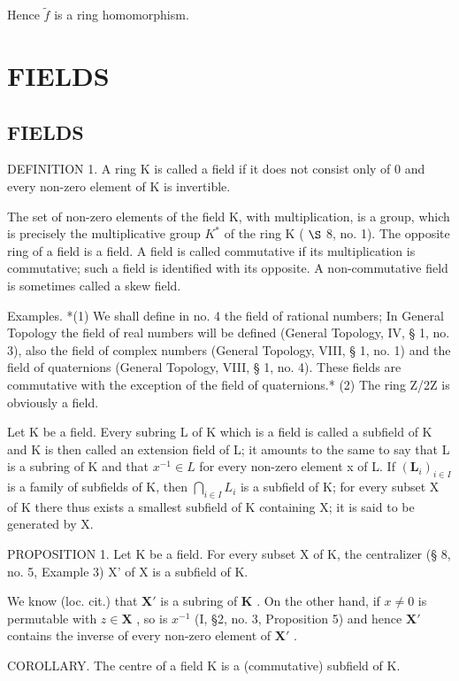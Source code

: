 Hence \(\tilde{f}\) is a ring homomorphism.

\section{FIELDS}

\subsection{FIELDS}

DEFINITION 1. A ring K is called a field if it does not consist only of 0 and every non-zero element of K is invertible.

The set of non-zero elements of the field K, with multiplication, is a group, which is precisely the multiplicative group \(K^{*}\) of the ring K ( \(\S\) 8, no. 1). The opposite ring of a field is a field. A field is called commutative if its multiplication is commutative; such a field is identified with its opposite. A non-commutative field is sometimes called a skew field.

Examples. *(1) We shall define in no. 4 the field of rational numbers; In General Topology the field of real numbers will be defined (General Topology, IV, § 1, no. 3), also the field of complex numbers (General Topology, VIII, § 1, no. 1) and the field of quaternions (General Topology, VIII, § 1, no. 4). These fields are commutative with the exception of the field of quaternions.* (2) The ring Z/2Z is obviously a field.

Let K be a field. Every subring L of K which is a field is called a subfield of K and K is then called an extension field of L; it amounts to the same to say that L is a subring of K and that \(x^{-1} \in L\) for every non-zero element x of L. If \((\mathbf{L}_{i})_{i \in I}\) is a family of subfields of K, then \(\bigcap_{i \in I} L_{i}\) is a subfield of K; for every subset X of K there thus exists a smallest subfield of K containing X; it is said to be generated by X.

PROPOSITION 1. Let K be a field. For every subset X of K, the centralizer (§ 8, no. 5, Example 3) X' of X is a subfield of K.

We know (loc. cit.) that \(\mathbf{X}'\) is a subring of \(\mathbf{K}\) . On the other hand, if \(x \neq 0\) is permutable with \(z \in \mathbf{X}\) , so is \(x^{-1}\) (I, §2, no. 3, Proposition 5) and hence \(\mathbf{X}'\) contains the inverse of every non-zero element of \(\mathbf{X}'\) .

COROLLARY. The centre of a field K is a (commutative) subfield of K.

